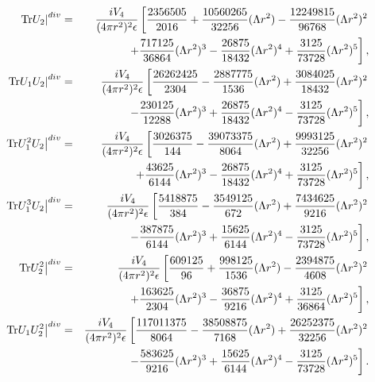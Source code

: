 \documentclass[a4paper,aps,preprint,groupedaddress,showpacs]{revtex4}
\begin{document}
\begin{eqnarray}
\left.{\rm Tr}U_{2}\right\vert^{div}&=&
\frac{iV_{4}}{(4\pi r^{2})^{2}\epsilon}
\left[\frac{2356505}{2016}+
\frac{10560265}{32256}(\Lambda r^{2})-
\frac{12249815}{96768}(\Lambda r^{2})^{2}\right.
\nonumber\\
&&\ \ \left.
+\frac{717125}{36864}(\Lambda r^{2})^{3}-
\frac{26875}{18432}(\Lambda r^{2})^{4}+
\frac{3125}{73728}(\Lambda r^{2})^{5}\right],
\\
\left.{\rm Tr}U_{1}U_{2}\right\vert^{div}&=&
\frac{iV_{4}}{(4\pi r^{2})^{2}\epsilon}
\left[\frac{26262425}{2304}-
\frac{2887775}{1536}(\Lambda r^{2})+
\frac{3084025}{18432}(\Lambda r^{2})^{2}\right.
\nonumber\\
&&\ \ \left.
-\frac{230125}{12288}(\Lambda r^{2})^{3}+
\frac{26875}{18432}(\Lambda r^{2})^{4}-
\frac{3125}{73728}(\Lambda r^{2})^{5}\right],
\\
\left.{\rm Tr}U_{1}^{2}U_{2}\right\vert^{div}&=&
\frac{iV_{4}}{(4\pi r^{2})^{2}\epsilon}
\left[\frac{3026375}{144}-
\frac{39073375}{8064}(\Lambda r^{2})+
\frac{9993125}{32256}(\Lambda r^{2})^{2}\right.
\nonumber\\
&&\ \ \left.
+\frac{43625}{6144}(\Lambda r^{2})^{3}-
\frac{26875}{18432}(\Lambda r^{2})^{4}+
\frac{3125}{73728}(\Lambda r^{2})^{5}\right],
\\
\left.{\rm Tr}U_{1}^{3}U_{2}\right\vert^{div}&=&
\frac{iV_{4}}{(4\pi r^{2})^{2}\epsilon}
\left[\frac{5418875}{384}-
\frac{3549125}{672}(\Lambda r^{2})+
\frac{7434625}{9216}(\Lambda r^{2})^{2}\right.
\nonumber\\
&&\ \ \left.
-\frac{387875}{6144}(\Lambda r^{2})^{3}+
\frac{15625}{6144}(\Lambda r^{2})^{4}-
\frac{3125}{73728}(\Lambda r^{2})^{5}\right],
\\
\left.{\rm Tr}U_{2}^{2}\right\vert^{div}&=&
\frac{iV_{4}}{(4\pi r^{2})^{2}\epsilon}
\left[\frac{609125}{96}+
\frac{998125}{1536}(\Lambda r^{2})-
\frac{2394875}{4608}(\Lambda r^{2})^{2}\right.
\nonumber\\
&&\ \ \left.
+\frac{163625}{2304}(\Lambda r^{2})^{3}-
\frac{36875}{9216}(\Lambda r^{2})^{4}+
\frac{3125}{36864}(\Lambda r^{2})^{5}\right],
\\
\left.{\rm Tr}U_{1}U_{2}^{2}\right\vert^{div}&=&
\frac{iV_{4}}{(4\pi r^{2})^{2}\epsilon}
\left[\frac{117011375}{8064}-
\frac{38508875}{7168}(\Lambda r^{2})+
\frac{26252375}{32256}(\Lambda r^{2})^{2}\right.
\nonumber\\
&&\ \ \left.
-\frac{583625}{9216}(\Lambda r^{2})^{3}+
\frac{15625}{6144}(\Lambda r^{2})^{4}-
\frac{3125}{73728}(\Lambda r^{2})^{5}\right].
\end{eqnarray}
\end{document}

